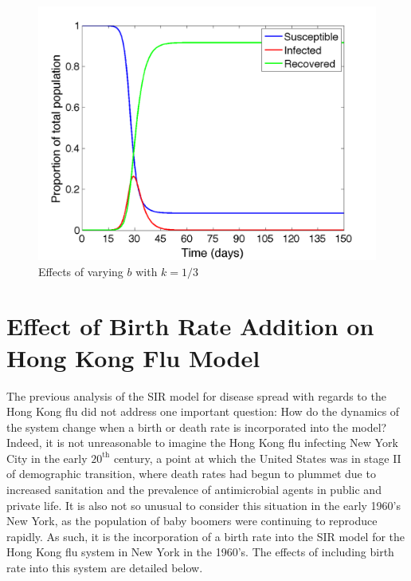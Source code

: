 \documentclass{article}
\begin{document}
\begin{figure}[h!]
\begin{minipage}{.32\textwidth}
\end{minipage}
\begin{minipage}{.32\textwidth}
    \centering
    \includegraphics[width=\linewidth]{b09k033333}
\end{minipage}
\caption{Effects of varying $b$ with $k=1/3$}
\label{varyingb}
\end{figure}

\section{Effect of Birth Rate Addition on Hong Kong Flu Model}
\singlespacing
The previous analysis of the SIR model for disease spread with regards to the Hong Kong flu did not address one important question: How do the dynamics of the system change when a birth or death rate is incorporated into the model? Indeed, it is not unreasonable to imagine the Hong Kong flu infecting New York City in the early $20^{\mathrm{th}}$ century, a point at which the United States was in stage II of demographic transition, where death rates had begun to plummet due to increased sanitation and the prevalence of antimicrobial agents in public and private life. It is also not so unusual to consider this situation in the early 1960's New York, as the population of baby boomers were continuing to reproduce rapidly. As such, it is the incorporation of a birth rate into the SIR model for the Hong Kong flu system in New York in the 1960's. The effects of including birth rate into this system are detailed below.
\end{document}
